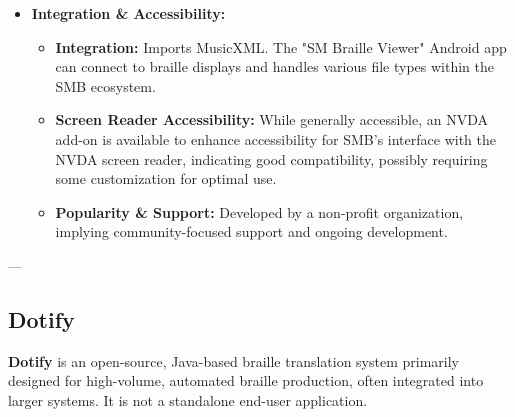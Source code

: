 \begin{itemize}
    \item \textbf{Integration & Accessibility:}
    \begin{itemize}
        \item \textbf{Integration:} Imports MusicXML. The "SM Braille Viewer" Android app can connect to braille displays and handles various file types within the SMB ecosystem.
        \item \textbf{Screen Reader Accessibility:} While generally accessible, an NVDA add-on is available to enhance accessibility for SMB's interface with the NVDA screen reader, indicating good compatibility, possibly requiring some customization for optimal use\footnotemark{}.
        \item \textbf{Popularity \& Support:} Developed by a non-profit organization, implying community-focused support and ongoing development.
    \end{itemize}
\end{itemize}

---

\subsection{Dotify}
\textbf{Dotify} is an open-source, Java-based braille translation system primarily designed for high-volume, automated braille production, often integrated into larger systems. It is not a standalone end-user application.

